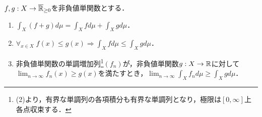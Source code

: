 \documentclass[uplatex, dvipdfmx]{jsreport}
\begin{document}
\begin{lemma}\label{lemma-integral-for-simple-functions}
    $f,g:X\to\overline{\mathbb{R}}_{\ge 0}$を非負値単関数とする．
    \begin{enumerate}
        \item $\int_X(f+g)d\mu=\int_Xfd\mu+\int_Xgd\mu$．
        \item $\forall_{x\in X}\;f(x)\le g(x)\Rightarrow\int_Xfd\mu\le\int_X gd\mu$．
        \item 非負値単関数の単調増加列\footnote{(2)より，有界な単調列の各項積分も有界な単調列となり，極限は$[0,\infty]$上各点収束する．}$(f_n)$が，非負値単関数$g:X\to\mathbb{R}$に対して$\lim_{n\to\infty}f_n(x)\ge g(x)$を満たすとき，$\lim_{n\to\infty}\int_Xf_nd\mu\ge\int_Xgd\mu$．
    \end{enumerate}
\end{lemma}
\end{document}
